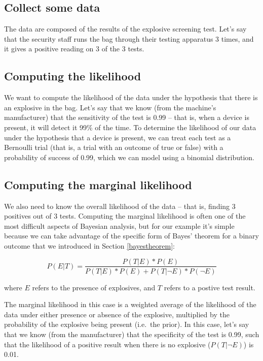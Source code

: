 \documentclass[
  12pt,
]{book}
\begin{document}
\hypertarget{collect-some-data}{%
\subsection{Collect some data}\label{collect-some-data}}

The data are composed of the results of the explosive screening test. Let's say that the security staff runs the bag through their testing apparatus 3 times, and it gives a positive reading on 3 of the 3 tests.

\hypertarget{computing-the-likelihood}{%
\subsection{Computing the likelihood}\label{computing-the-likelihood}}

We want to compute the likelihood of the data under the hypothesis that there is an explosive in the bag. Let's say that we know (from the machine's manufacturer) that the sensitivity of the test is 0.99 -- that is, when a device is present, it will detect it 99\% of the time. To determine the likelihood of our data under the hypothesis that a device is present, we can treat each test as a Bernoulli trial (that is, a trial with an outcome of true or false) with a probability of success of 0.99, which we can model using a binomial distribution.

\hypertarget{computing-the-marginal-likelihood}{%
\subsection{Computing the marginal likelihood}\label{computing-the-marginal-likelihood}}

We also need to know the overall likelihood of the data -- that is, finding 3 positives out of 3 tests. Computing the marginal likelihood is often one of the most difficult aspects of Bayesian analysis, but for our example it's simple because we can take advantage of the specific form of Bayes' theorem for a binary outcome that we introduced in Section \ref{bayestheorem}:

\[
P(E|T) = \frac{P(T|E)*P(E)}{P(T|E)*P(E) + P(T|\neg E)*P(\neg E)}
\]

where \(E\) refers to the presence of explosives, and \(T\) refers to a postive test result.

The marginal likelihood in this case is a weighted average of the likelihood of the data under either presence or absence of the explosive, multiplied by the probability of the explosive being present (i.e.~the prior). In this case, let's say that we know (from the manufacturer) that the specificity of the test is 0.99, such that the likelihood of a positive result when there is no explosive (\(P(T|\neg E)\)) is 0.01.
\end{document}
